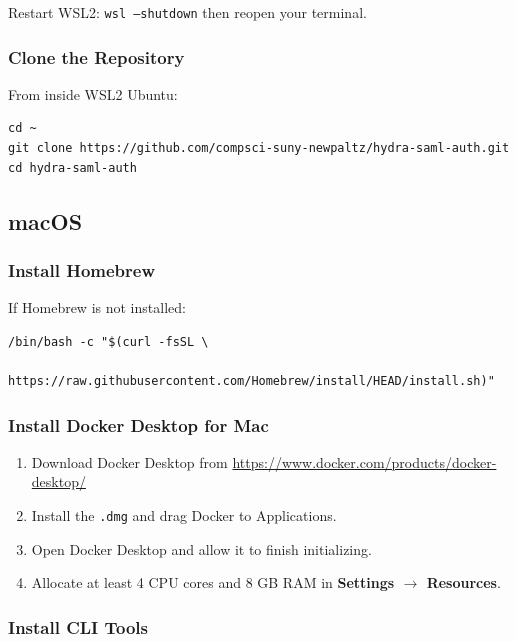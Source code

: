 \documentclass[11pt,a4paper]{article}
\newcommand{\cmdref}[1]{\texttt{#1}}
\begin{document}
Restart WSL2: \cmdref{wsl --shutdown} then reopen your terminal.

\subsubsection{Clone the Repository}

From inside WSL2 Ubuntu:

\begin{lstlisting}[style=bash]
cd ~
git clone https://github.com/compsci-suny-newpaltz/hydra-saml-auth.git
cd hydra-saml-auth
\end{lstlisting}

\subsection{macOS}
\label{sec:prereq-macos}

\subsubsection{Install Homebrew}

If Homebrew is not installed:

\begin{lstlisting}[style=bash]
/bin/bash -c "$(curl -fsSL \
    https://raw.githubusercontent.com/Homebrew/install/HEAD/install.sh)"
\end{lstlisting}

\subsubsection{Install Docker Desktop for Mac}

\begin{enumerate}[leftmargin=2em]
    \item Download Docker Desktop from
          \url{https://www.docker.com/products/docker-desktop/}
    \item Install the \texttt{.dmg} and drag Docker to Applications.
    \item Open Docker Desktop and allow it to finish initializing.
    \item Allocate at least 4 CPU cores and 8 GB RAM in
          \textbf{Settings $\rightarrow$ Resources}.
\end{enumerate}

\subsubsection{Install CLI Tools}
\end{document}
